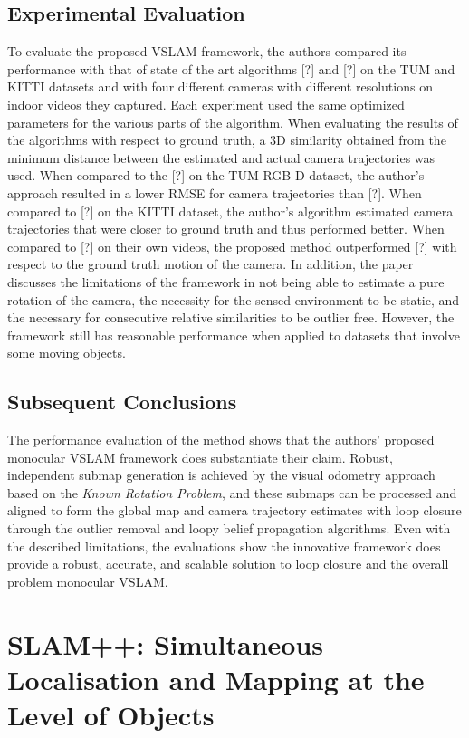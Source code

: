\documentclass[10pt,twocolumn,letterpaper]{article}
\begin{document}
\subsection{Experimental Evaluation}
To evaluate the proposed VSLAM framework, the authors compared its performance 
with that of state of the art algorithms [?] and [?] on the TUM and KITTI datasets and 
with four different cameras with different resolutions on indoor videos they captured.  
Each experiment used the same optimized parameters for the various parts of the algorithm.  
When evaluating the results of the algorithms with respect to ground truth, a 3D similarity 
obtained from the minimum distance between the estimated and actual camera trajectories 
was used.  When compared to the [?] on the TUM RGB-D dataset, the author's approach resulted in a 
lower RMSE for camera trajectories than [?].  When compared to [?] on the KITTI dataset, 
the author's algorithm estimated camera trajectories that were closer to ground truth and 
thus performed better. When compared to [?] on their own videos, the proposed 
method outperformed [?] with respect to the ground truth motion of the camera.  
In addition, the paper discusses the limitations of the framework in not being able to 
estimate a pure rotation of the camera, the necessity for the sensed environment 
to be static, and the necessary for consecutive relative similarities to be outlier free. 
However, the framework still has reasonable performance when applied to datasets 
that involve some moving objects.

\subsection{Subsequent Conclusions}
The performance evaluation of the method shows that the authors' proposed monocular VSLAM framework does
 substantiate their claim.  Robust, independent submap generation is achieved by the visual odometry approach 
based on the \textit{Known Rotation Problem}, and these submaps can be processed and aligned to form the 
global map and camera trajectory estimates with loop closure through the outlier removal and loopy belief 
propagation algorithms.  Even with the described limitations, the evaluations show the innovative framework does 
provide a robust, accurate, and scalable solution to loop closure and the overall problem monocular VSLAM.

\section {SLAM++: Simultaneous Localisation and Mapping at the Level of Objects}
\end{document}
